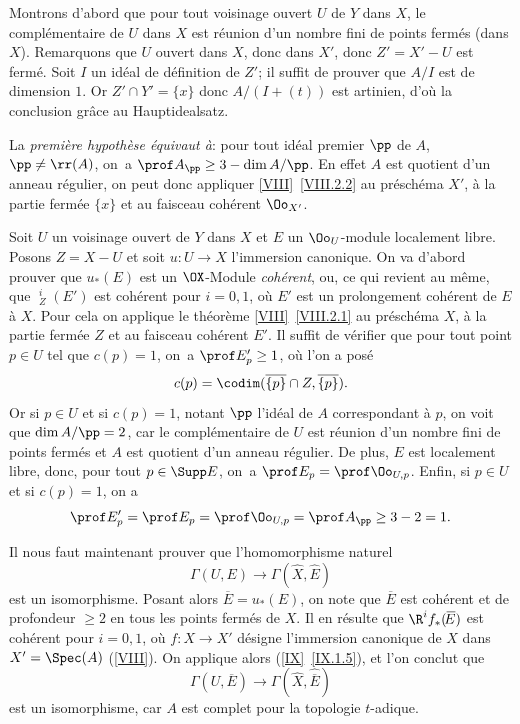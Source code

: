 Montrons d'abord que pour tout voisinage ouvert $U$ de $Y$ dans $X$, le compl\'ementaire de $U$ dans $X$ est r\'eunion d'un nombre fini de points ferm\'es (dans $X$). Remarquons que $U$ ouvert dans $X$, donc dans $X'$, donc $Z'=X'-U$ est ferm\'e. Soit $I$ un id\'eal de d\'efinition de $Z'$; il suffit de prouver que $A/I$ est de dimension $1$. Or $Z'\cap Y'=\{x\}$ donc $A/(I+(t))$ est artinien, d'o\`u la conclusion gr\^ace au \og Hauptidealsatz\fg.

La \emph{première hypothèse équivaut à}: \og pour tout id\'eal premier $\pp$ de $A$, $\pp\neq \rr(A)$, on~a $\prof A_\pp\geq3-\dim A/\pp$\fg. En effet $A$ est quotient d'un anneau r\'egulier, on peut donc appliquer \ref{VIII}~\ref{VIII.2.2} au pr\'esch\'ema $X'$, \`a la partie ferm\'ee $\{x\}$ et au faisceau coh\'erent $\Oo_{X'}$.

Soit $U$ un voisinage ouvert de $Y$ dans $X$ et $E$ un $\Oo_U$-module localement libre. Posons $Z=X-U$ et soit $u\colon U\to X$ l'immersion canonique. On va d'abord prouver que $u_\ast(E)$ est un $\OX$-Module \emph{cohérent}, ou, ce qui revient au m\^eme, que $\mathop{\underline{\mathrm{H}}}\nolimits^i_Z(E')$ est coh\'erent pour $i=0, 1$, o\`u $E'$ est un prolongement coh\'erent de $E$ \`a $X$. Pour cela on applique le th\'eor\`eme \ref{VIII}~\ref{VIII.2.1} au pr\'esch\'ema $X$, \`a la partie ferm\'ee $Z$ et au faisceau coh\'erent $E'$. Il suffit de v\'erifier que pour tout point $p\in U$ tel que $c(p)=1$, on~a $\prof E'_p\geq 1$, o\`u l'on a pos\'e
\[
c(p)=\codim (\overline{\{p\}}\cap Z, \overline{\{p\}}).
\]
Or si $p\in U$ et si $c(p)=1$, notant $\pp$ l'id\'eal de $A$ correspondant \`a $p$, on voit que $\dim A/\pp=2$, car le compl\'ementaire de $U$ est r\'eunion d'un nombre fini de points ferm\'es et $A$ est quotient d'un anneau r\'egulier. De plus, $E$ est localement libre, donc, pour tout $p\in\Supp E$, on~a $\prof E_p=\prof\Oo_{U, p}$. Enfin, si $p\in U$ et si $c(p)=1$, on a
\[
\prof E'_p = \prof E_p = \prof\Oo_{U, p} = \prof A_\pp \geq 3-2=1.
\]

Il nous faut maintenant prouver que l'homomorphisme naturel
\begin{equation} \label{eq:X.1} {\Gamma(U, E) \to \Gamma(\hat{X}, \hat{E})}
\end{equation}
est un isomorphisme. Posant alors $\overline{\!E}=u_\ast(E)$, on note que $\overline{\!E}$ est coh\'erent et de profondeur $\geq 2$ en tous les points ferm\'es de $X$. Il en r\'esulte que $\R^i f_\ast(\overline{\!E})$ est coh\'erent pour $i=0, 1$, o\`u $f\colon X\to X'$ d\'esigne l'immersion canonique de $X$ dans $X'=\Spec(A)$ (\Exp \ref{VIII}). On applique alors (\ref{IX}~\ref{IX.1.5}), et l'on conclut que
\begin{equation} \label{eq:X.2}
\Gamma(U, \overline{\!E}) \to \Gamma(\hat{X}, \widehat{\overline{\!E}})
\end{equation}
est un isomorphisme, car $A$ est complet pour la topologie $t$-adique.

